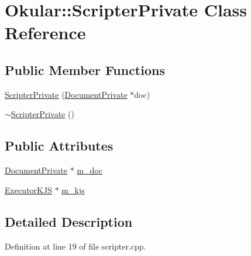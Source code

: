 \hypertarget{classOkular_1_1ScripterPrivate}{\section{Okular\+:\+:Scripter\+Private Class Reference}
\label{classOkular_1_1ScripterPrivate}
}
\subsection*{Public Member Functions}
\begin{DoxyCompactItemize}
\item 
\hyperlink{classOkular_1_1ScripterPrivate_a9e211661d23418f2ad9b2358c8cb2df0}{Scripter\+Private} (\hyperlink{classOkular_1_1DocumentPrivate}{Document\+Private} $\ast$doc)
\item 
\hyperlink{classOkular_1_1ScripterPrivate_aff22cb779f52bf47fd023fcf29eea393}{$\sim$\+Scripter\+Private} ()
\end{DoxyCompactItemize}
\subsection*{Public Attributes}
\begin{DoxyCompactItemize}
\item 
\hyperlink{classOkular_1_1DocumentPrivate}{Document\+Private} $\ast$ \hyperlink{classOkular_1_1ScripterPrivate_ada92eacd9472f54bfa575c84bd69db8e}{m\+\_\+doc}
\item 
\hyperlink{classOkular_1_1ExecutorKJS}{Executor\+K\+J\+S} $\ast$ \hyperlink{classOkular_1_1ScripterPrivate_a6e9f75481e8e1fe57efbffccd08a2077}{m\+\_\+kjs}
\end{DoxyCompactItemize}


\subsection{Detailed Description}


Definition at line 19 of file scripter.\+cpp.



